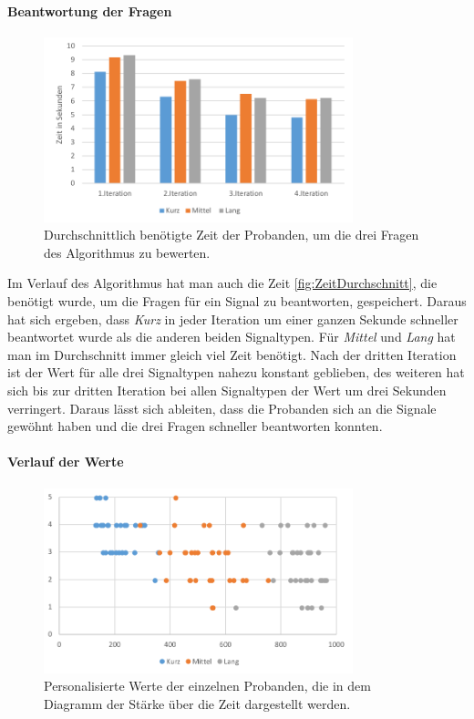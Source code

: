 \paragraph{Beantwortung der Fragen}
\begin{figure}[htbp] 
            \centering
   	\includegraphics[width=0.8\textwidth]{pics/analyse/algo/ZeitDurchschnitt.png}
	\caption{Durchschnittlich ben{\"o}tigte Zeit der Probanden, um die drei Fragen des Algorithmus zu bewerten.}
	\label{fig:ZeitDurchschnitt}
\end{figure}
Im Verlauf des Algorithmus hat man auch die Zeit \autoref{fig:ZeitDurchschnitt}, die ben{\"o}tigt wurde, um die Fragen f{\"u}r ein Signal zu beantworten, gespeichert. 
Daraus hat sich ergeben, dass \textit{Kurz} in jeder Iteration um einer ganzen Sekunde schneller beantwortet wurde als die anderen beiden Signaltypen. 
F{\"u}r \textit{Mittel} und \textit{Lang} hat man im Durchschnitt immer gleich viel Zeit ben{\"o}tigt.
Nach der dritten Iteration ist der Wert f{\"u}r alle drei Signaltypen nahezu konstant geblieben, des weiteren hat sich bis zur dritten Iteration bei allen Signaltypen der Wert um drei Sekunden verringert. 
Daraus l{\"a}sst sich ableiten, dass die Probanden sich an die Signale gew{\"o}hnt haben und die drei Fragen schneller beantworten konnten.

\paragraph{Verlauf der Werte}
\begin{figure}[htbp] 
            \centering
   	\includegraphics[width=0.8\textwidth]{pics/analyse/algo/ergebnisnachAlgo.png}
	\caption{Personalisierte Werte der einzelnen Probanden, die in dem Diagramm der St{\"a}rke {\"u}ber die Zeit dargestellt werden.}
	\label{fig:ergebnisNachAlgo}
\end{figure}

